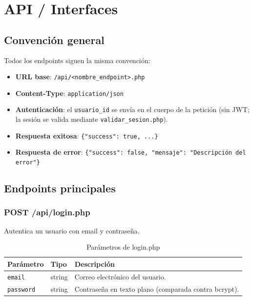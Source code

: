 \documentclass[10pt,letterpaper]{report}
\begin{document}
\chapter{API / Interfaces}

\section{Convención general}

Todos los endpoints siguen la misma convención:

\begin{itemize}
  \item \textbf{URL base}: \texttt{/api/<nombre\_endpoint>.php}
  \item \textbf{Content-Type}: \texttt{application/json}
  \item \textbf{Autenticación}: el \texttt{usuario\_id} se envía en el cuerpo de la petición (sin JWT; la sesión se valida mediante \texttt{validar\_sesion.php}).
  \item \textbf{Respuesta exitosa}: \texttt{\{"success": true, ...\}}
  \item \textbf{Respuesta de error}: \texttt{\{"success": false, "mensaje": "Descripción del error"\}}
\end{itemize}

\section{Endpoints principales}

\subsection{POST /api/login.php}

Autentica un usuario con email y contraseña.

\begin{table}[H]
\centering
\caption{Parámetros de login.php}
\label{tab:api-login}
\begin{tabular}{p{} p{} p{}}
\toprule
\textbf{Parámetro} & \textbf{Tipo} & \textbf{Descripción} \\
\midrule
\texttt{email} & string & Correo electrónico del usuario. \\
\texttt{password} & string & Contraseña en texto plano (comparada contra bcrypt). \\
\bottomrule
\end{tabular}
\end{table}
\end{document}

